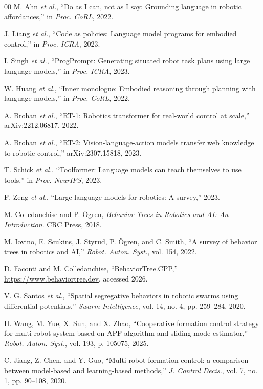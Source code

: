 \documentclass[conference]{IEEEtran}
\begin{document}
\begin{thebibliography}{00}
M. Ahn \emph{et al.},
``Do as I can, not as I say: Grounding language in robotic
affordances,''
in \emph{Proc. CoRL}, 2022.

J. Liang \emph{et al.},
``Code as policies: Language model programs for embodied
control,''
in \emph{Proc. ICRA}, 2023.

I. Singh \emph{et al.},
``ProgPrompt: Generating situated robot task plans using
large language models,''
in \emph{Proc. ICRA}, 2023.

W. Huang \emph{et al.},
``Inner monologue: Embodied reasoning through planning with
language models,''
in \emph{Proc. CoRL}, 2022.

A. Brohan \emph{et al.},
``RT-1: Robotics transformer for real-world control at
scale,'' arXiv:2212.06817, 2022.

A. Brohan \emph{et al.},
``RT-2: Vision-language-action models transfer web knowledge
to robotic control,'' arXiv:2307.15818, 2023.

T. Schick \emph{et al.},
``Toolformer: Language models can teach themselves to use
tools,''
in \emph{Proc. NeurIPS}, 2023.

F. Zeng \emph{et al.},
``Large language models for robotics: A survey,'' 2023.

M. Colledanchise and P. {\"O}gren,
\emph{Behavior Trees in Robotics and AI: An Introduction}.
CRC Press, 2018.

M. Iovino, E. Scukins, J. Styrud, P. {\"O}gren, and C. Smith,
``A survey of behavior trees in robotics and AI,''
\emph{Robot. Auton. Syst.}, vol. 154, 2022.

D. Faconti and M. Colledanchise,
``BehaviorTree.CPP,''
\url{https://www.behaviortree.dev}, accessed 2026.

V. G. Santos \emph{et al.},
``Spatial segregative behaviors in robotic swarms using
differential potentials,''
\emph{Swarm Intelligence}, vol. 14, no. 4, pp. 259--284, 2020.

H. Wang, M. Yue, X. Sun, and X. Zhao,
``Cooperative formation control strategy for multi-robot
system based on APF algorithm and sliding mode estimator,''
\emph{Robot. Auton. Syst.}, vol. 193, p. 105075, 2025.

C. Jiang, Z. Chen, and Y. Guo,
``Multi-robot formation control: a comparison between
model-based and learning-based methods,''
\emph{J. Control Decis.}, vol. 7, no. 1, pp. 90--108, 2020.


\end{thebibliography}
\end{document}
